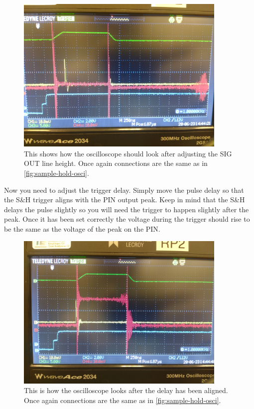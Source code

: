 \documentclass[a4paper, 10pt]{article}
\begin{document}
\begin{figure}[H]
    \centering
    \includegraphics[width=0.9\textwidth]{../images/config-height-adjust.jpg}
    \caption{This shows how the oscilloscope should look after adjusting the SIG OUT line height. Once again connections are the same as in \cref{fig:sample-hold-osci}.}
    \label{fig:config-height-adjust}
\end{figure}

Now you need to adjust the trigger delay.
Simply move the pulse delay so that the S\&H trigger aligns with the PIN output peak.
Keep in mind that the S\&H delays the pulse slightly so you will need the trigger to happen slightly after the peak.
Once it has been set correctly the voltage during the trigger should rise to be the same as the voltage of the peak on the PIN.

\begin{figure}[H]
    \centering
    \includegraphics[width=0.9\textwidth]{../images/config-delay-aligned.jpg}
    \caption{This is how the oscilloscope looks after the delay has been aligned. Once again connections are the same as in \cref{fig:sample-hold-osci}.}
    \label{fig:config-delay-aligned}
\end{figure}
\end{document}
